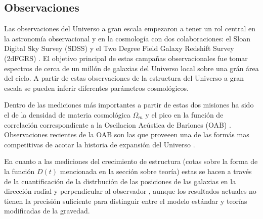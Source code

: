\subsection{Observaciones}

Las observaciones del Universo a gran escala empezaron a tener un rol
central en la astronom\'ia observacional y en la cosmolog\'ia con dos
colaboraciones: el Sloan Digital Sky Survey (SDSS) \cite{SDSS} y el Two Degree
Field Galaxy Redshift Survey (2dFGRS) \cite{2dF}. 
El objetivo principal de estas campa\~nas observacionales fue tomar
espectros de cerca de un mill\'on de galaxias del Universo local sobre
una gr\'an \'area del cielo. 
A partir de estas observaciones de la estructura del Universo a gran
escala se pueden inferir diferentes par\'ametros cosmol\'ogicos.

Dentro de las mediciones m\'as importantes a partir de estas dos misiones
ha sido el de la densidad de materia cosmol\'ogica $\Omega_m$
\cite{2001Natur.410..169P} y el pico en la funci\'on de
correlaci\'on correspondiente a la Oscilacion Ac\'ustica de Bariones
(OAB) \cite{Eisenstein2005}. 
Observaciones recientes de la OAB son las que proveeen una de las
form\'as mas competitivas de acotar la historia de expansi\'on del
Universo \cite{2014MNRAS.441...24A}. 

En cuanto a las mediciones del crecimiento de estructura (cotas sobre
la forma de la funci\'on $D(t)$ mencionada en la secci\'on sobre
teor\'ia) estas se hacen a trav\'es de la cuantificaci\'on de la
distrbuci\'on de las posiciones de las galaxias en la direcci\'on
radial y perpendicular al observador \cite{2014MNRAS.439.3504S},
aunque los resultados actuales no tienen la precisión suficiente 
para distinguir entre el modelo est\'andar y teor\'ias
modificadas de la gravedad. 

